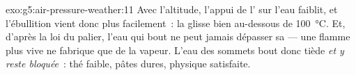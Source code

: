 \begin{solution}{exo:g5:air-pressure-weather:11}
Avec l'altitude, l'appui de l' sur l'eau faiblit, et
l'ébullition vient donc plus facilement~: la 
glisse bien au-dessous de \qty{100}{\celsius}. Et, d'après la loi du
palier, l'eau qui bout ne peut jamais dépasser sa  --- une flamme plus vive ne fabrique que de la vapeur.
L'eau des sommets bout donc tiède \emph{et y reste bloquée}~: thé
faible, pâtes dures, physique satisfaite.
\end{solution}
